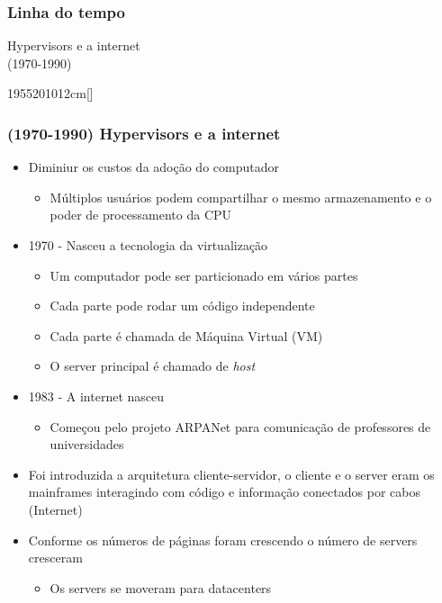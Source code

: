 \begin{frame}
	\frametitle{Linha do tempo}
	\begin{center}
		Hypervisors e a internet \\
		(1970-1990)
	\end{center}
	\hfill
	\begin{scriptsize}
	\begin{bf}
	\begin{center}
		\begin{chronology}[10]{1955}{2010}{12cm}[\textwidth]
			 
			\color{lightgreen}
		\end{chronology}
	\end{center}
	\end{bf}
	\end{scriptsize}
\end{frame}

\begin{frame}[allowframebreaks]
	\frametitle{(1970-1990) Hypervisors e a internet}
	\begin{itemize}
		\item Diminiur os custos da adoção do computador
			\begin{itemize}
				\item Múltiplos usuários podem compartilhar o mesmo armazenamento e o poder de processamento da CPU
			\end{itemize}
		\item 1970 - Nasceu a tecnologia da virtualização
			\begin{itemize}
				\item Um computador pode ser particionado em vários partes
				\item Cada parte pode rodar um código independente
				\item Cada parte é chamada de Máquina Virtual (VM)
				\item O server principal é chamado de \it{host}
			\end{itemize}
		\item 1983 - A internet nasceu
			\begin{itemize}
				\item Começou pelo projeto ARPANet para comunicação de professores de universidades
			\end{itemize}
		\item Foi introduzida a arquitetura cliente-servidor, o cliente e o server eram os mainframes interagindo com código e informação conectados por cabos (Internet)
		\item Conforme os números de páginas foram crescendo o número de servers cresceram
			\begin{itemize}
				\item Os servers se moveram para datacenters
			\end{itemize}
	\end{itemize}
\end{frame}

